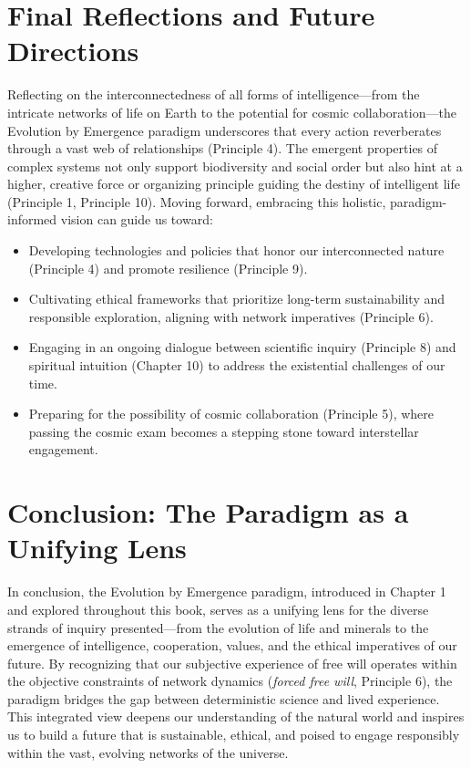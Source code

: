 \section{Final Reflections and Future Directions}
Reflecting on the interconnectedness of all forms of intelligence—from the intricate networks of life on Earth to the potential for cosmic collaboration—the Evolution by Emergence paradigm underscores that every action reverberates through a vast web of relationships (Principle 4). The emergent properties of complex systems not only support biodiversity and social order but also hint at a higher, creative force or organizing principle guiding the destiny of intelligent life (Principle 1, Principle 10). Moving forward, embracing this holistic, paradigm-informed vision can guide us toward:
\begin{itemize}
    \item Developing technologies and policies that honor our interconnected nature (Principle 4) and promote resilience (Principle 9).
    \item Cultivating ethical frameworks that prioritize long-term sustainability and responsible exploration, aligning with network imperatives (Principle 6).
    \item Engaging in an ongoing dialogue between scientific inquiry (Principle 8) and spiritual intuition (Chapter 10) to address the existential challenges of our time.
    \item Preparing for the possibility of cosmic collaboration (Principle 5), where passing the cosmic exam becomes a stepping stone toward interstellar engagement.
\end{itemize} %

\section{Conclusion: The Paradigm as a Unifying Lens} %
In conclusion, the Evolution by Emergence paradigm, introduced in Chapter 1 and explored throughout this book, serves as a unifying lens for the diverse strands of inquiry presented—from the evolution of life and minerals to the emergence of intelligence, cooperation, values, and the ethical imperatives of our future. By recognizing that our subjective experience of free will operates within the objective constraints of network dynamics (\emph{forced free will}, Principle 6), the paradigm bridges the gap between deterministic science and lived experience. This integrated view deepens our understanding of the natural world and inspires us to build a future that is sustainable, ethical, and poised to engage responsibly within the vast, evolving networks of the universe. %
\cleardoublepage